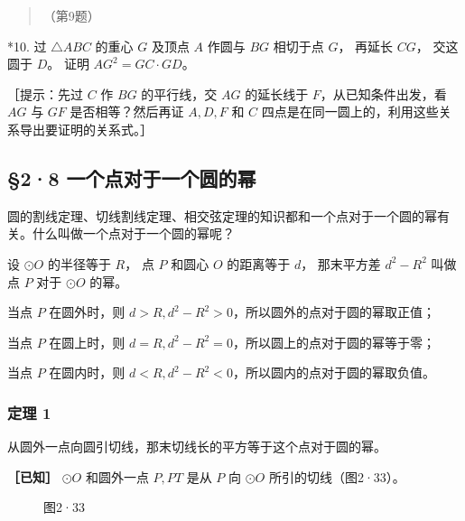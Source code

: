 \begin{quote}
（第9题）
\end{quote}

*10. 过 \(\triangle ABC\) 的重心 \(G\) 及顶点 \(A\) 作圆与 \(BG\)
相切于点 \(G\)， 再延长 \(CG\)， 交这圆于 \(D\)。 证明
\(AG^2 = GC \cdot GD\)。

［提示：先过 \(C\) 作 \(BG\) 的平行线，交 \(AG\) 的延长线于
\(F\)，从已知条件出发，看 \(AG\) 与 \(GF\) 是否相等？然后再证
\(A, D, F\) 和 \(C\)
四点是在同一圆上的，利用这些关系导出要证明的关系式。］

\subsection{§2·8
一个点对于一个圆的幂}

圆的割线定理、切线割线定理、相交弦定理的知识都和一个点对于一个圆的幂有关。什么叫做一个点对于一个圆的幂呢？

设 \(\odot O\) 的半径等于 \(R\)， 点 \(P\) 和圆心 \(O\) 的距离等于
\(d\)， 那末平方差 \(d^2 - R^2\) 叫做点 \(P\) 对于 \(\odot O\) 的幂。

当点 \(P\) 在圆外时，则
\(d > R, d^2 - R^2 > 0\)，所以圆外的点对于圆的幂取正值；

当点 \(P\) 在圆上时，则
\(d = R, d^2 - R^2 = 0\)，所以圆上的点对于圆的幂等于零；

当点 \(P\) 在圆内时，则
\(d < R, d^2 - R^2 < 0\)，所以圆内的点对于圆的幂取负值。

\subsubsection{定理 1}

从圆外一点向圆引切线，那末切线长的平方等于这个点对于圆的幂。

\textbf{［已知］} \(\odot O\) 和圆外一点 \(P, PT\) 是从 \(P\) 向
\(\odot O\) 所引的切线（图2·33）。

\begin{figure}
\centering
{}
\caption{图2·33}
\end{figure}

